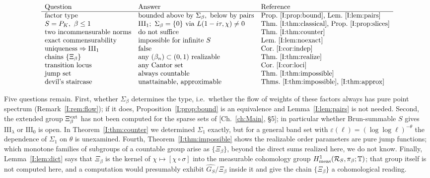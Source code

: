 \[
\begin{array}{lll}
\text{Question} & \text{Answer} & \text{Reference}\\\hline
\text{factor type} & \text{bounded above by}\ \Sigma_\beta,\ \text{below by pairs} & \text{Prop.~\ref{I:prop:bound}, Lem.~\ref{I:lem:pairs}}\\
S=P_K,\ \beta\le1 & \mathrm{III}_1;\ \Sigma_\beta=\{0\}\ \text{via}\ L(1-i\tau,\chi)\ne0 & \text{Thm.~\ref{I:thm:classical}, Prop.~\ref{I:prop:slices}}\\
\text{two incommensurable norms} & \text{do not suffice} & \text{Thm.~\ref{I:thm:counter}}\\
\text{exact commensurability} & \text{impossible for infinite }S & \text{Lem.~\ref{I:lem:noexact}}\\
\text{uniqueness}\Rightarrow\mathrm{III}_1 & \text{false} & \text{Cor.~\ref{I:cor:indep}}\\
\text{chains}\ \{\Xi_\beta\} & \text{any}\ (\beta_n)\subset(0,1)\ \text{realizable} & \text{Thm.~\ref{I:thm:realize}}\\
\text{transition locus} & \text{any Cantor set} & \text{Cor.~\ref{I:cor:loci}}\\
\text{jump set} & \text{always countable} & \text{Thm.~\ref{I:thm:impossible}}\\
\text{devil's staircase} & \text{unattainable, approximable} & \text{Thms.~\ref{I:thm:impossible}, \ref{I:thm:approx}}
\end{array}
\]

Five questions remain. First, whether $\Sigma_\beta$ determines the type, i.e.\ whether the
flow of weights of these factors always has pure point spectrum (Remark~\ref{I:rem:flow}); if
it does, Proposition~\ref{I:prop:bound} is an equivalence and Lemma~\ref{I:lem:pairs} is not
needed. Second, the extended group $\Xi^{\mathrm{ext}}_\beta$ has not been computed for the sparse sets
of [Ch.~\ref{ch:Main}, \S5]; in particular whether Brun-summable $S$ gives $\mathrm{III}_\lambda$ or
$\mathrm{III}_0$ is open. In Theorem~\ref{I:thm:counter} we determined $\Sigma_1$ exactly, but
for a general band set with $\varepsilon(\ell)=(\log\log\ell)^{-\theta}$ the dependence of
$\Sigma_1$ on $\theta$ is unexamined. Fourth, Theorem~\ref{I:thm:impossible} shows the
realizable order parameters are pure jump functions; which monotone families of subgroups of
a countable group arise as $\{\Xi_\beta\}$, beyond the direct sums realized here, we do not
know. Finally, Lemma~\ref{I:lem:dict} says that $\Xi_\beta$ is the kernel of
$\chi\mapsto[\chi\circ\sigma]$ into the measurable cohomology group
$H^1_{\mathrm{meas}}(\mathcal{R}_S,\pi_\beta;\mathbb{T})$; that group itself is not computed here, and a
computation would presumably exhibit $\widehat{G_S}/\Xi_\beta$ inside it and give the chain
$\{\Xi_\beta\}$ a cohomological reading.

